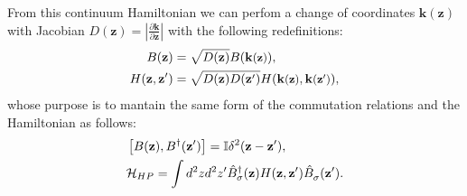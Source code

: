 \documentclass[english,aps,prd,nofootinbib,twocolumn]{revtex4-1}
\newcommand*{\Scale}[2][4]{\scalebox{#1}{$#2$}}%
\begin{document}
From this continuum Hamiltonian we can perfom a change of coordinates $\mathbf{k}(\mathbf{z})$ with Jacobian $D(\mathbf{z})=|\frac{\partial \mathbf{k}}{\partial \mathbf{z}}|$ with the following redefinitions:
\begin{equation}
\begin{split}
    B(\mathbf{z}) &= \sqrt{D(\mathbf{z})} 
    B(\mathbf{k}\Scale[0.9]{(\mathbf{z})}),
    \\
    H(\mathbf{z },\mathbf{z'})  &= \sqrt{D(\mathbf{z})D(\mathbf{z'})}
    H(\mathbf{k\Scale[0.9]{(\mathbf{z })}},\mathbf{k\Scale[0.9]{(\mathbf{z'})}}),
\end{split}
\end{equation}
whose purpose is to mantain the same form of the commutation relations and the Hamiltonian as follows:
\begin{equation*}
\begin{split}
&\left[
B(\mathbf{z }),B^{\textcolor{black}{\dagger}}(\mathbf{z'}) \right] =
\mathbb{I}\delta^{2}(\mathbf{z-z'}),
\\
&\mathcal{H}_{HP}
 = \int d^{2}z d^{2}z'
\hat{B}_{\sigma }^{\textcolor{black}{\dagger}}(\mathbf{z })
H(\mathbf{z },\mathbf{z'})
\hat{B}_{\sigma 
}^{\textcolor{white}{\dagger}}(\mathbf{z'})
.
\end{split}
\end{equation*}
\end{document}
